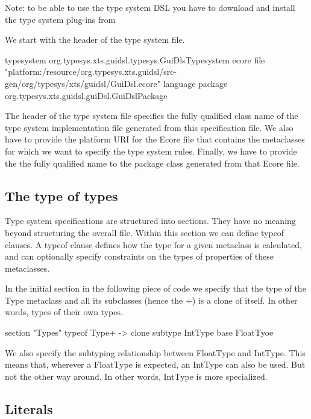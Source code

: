Note: to be able to use the type system DSL you have to download and install the
type system plug-ins from \todo

We start with the header of the type system file.

\begin{code}
typesystem org.typesys.xts.guidsl.typesys.GuiDlsTypesystem 
    ecore file "platform:/resource/org.typesys.xts.guidsl/src-gen/org/typesys/xts/guidsl/GuiDsl.ecore"
    language package org.typesys.xts.guidsl.guiDsl.GuiDslPackage 
\end{code}

The header of the type system file specifies the fully qualified class name of
the type system implementation file generated from this specification file. We
also have to provide the platform URI for the Ecore file that contains the
metaclasses for which we want to specify the type system rules. Finally, we have
to provide the the fully qualified name  to the package class  generated from
that Ecore file.

\subsection{The type of types}

Type system specifications  are structured into sections. They have no meaning
beyond structuring the overall file. Within this section we can define typeof
clauses. A typeof clause defines how the type for a given metaclass is
calculated, and can optionally specify constraints on the types of properties of
these metaclasses.

In the initial section in the following piece of code we specify  that the type
of the Type metaclass and all its subclasses (hence the +) is a clone of itself.
In other words, types of their own types.

\begin{code}
section "Types"
    typeof Type+ -> clone
    subtype IntType base FloatTyoe
\end{code}

We also specify the subtyping relationship between FloatType and IntType. This
means that, wherever a FloatType is expected, an IntType can also be used.  But
not the other way around. In other words, IntType is more specialized.

\subsection{Literals}

